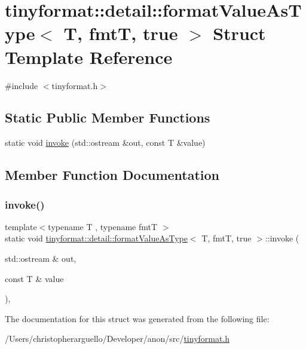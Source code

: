 \hypertarget{structtinyformat_1_1detail_1_1format_value_as_type_3_01_t_00_01fmt_t_00_01true_01_4}{}\section{tinyformat\+:\+:detail\+:\+:format\+Value\+As\+Type$<$ T, fmtT, true $>$ Struct Template Reference}
\label{structtinyformat_1_1detail_1_1format_value_as_type_3_01_t_00_01fmt_t_00_01true_01_4}


{\ttfamily \#include $<$tinyformat.\+h$>$}

\subsection*{Static Public Member Functions}
\begin{DoxyCompactItemize}
\item 
static void \mbox{\hyperlink{structtinyformat_1_1detail_1_1format_value_as_type_3_01_t_00_01fmt_t_00_01true_01_4_a7680bc0f7b6b5eee0e27c494812fb667}{invoke}} (std\+::ostream \&out, const T \&value)
\end{DoxyCompactItemize}


\subsection{Member Function Documentation}
\mbox{\label{structtinyformat_1_1detail_1_1format_value_as_type_3_01_t_00_01fmt_t_00_01true_01_4_a7680bc0f7b6b5eee0e27c494812fb667}} 
\subsubsection{\texorpdfstring{invoke()}{invoke()}}
{\footnotesize\ttfamily template$<$typename T , typename fmtT $>$ \\
static void \mbox{\hyperlink{structtinyformat_1_1detail_1_1format_value_as_type}{tinyformat\+::detail\+::format\+Value\+As\+Type}}$<$ T, fmtT, true $>$\+::invoke (\begin{DoxyParamCaption}\item[{std\+::ostream \&}]{out,  }\item[{const T \&}]{value }\end{DoxyParamCaption})\hspace{0.3cm}{\ttfamily [inline]}, {\ttfamily [static]}}



The documentation for this struct was generated from the following file\+:\begin{DoxyCompactItemize}
\item 
/\+Users/christopherarguello/\+Developer/anon/src/\mbox{\hyperlink{tinyformat_8h}{tinyformat.\+h}}\end{DoxyCompactItemize}
